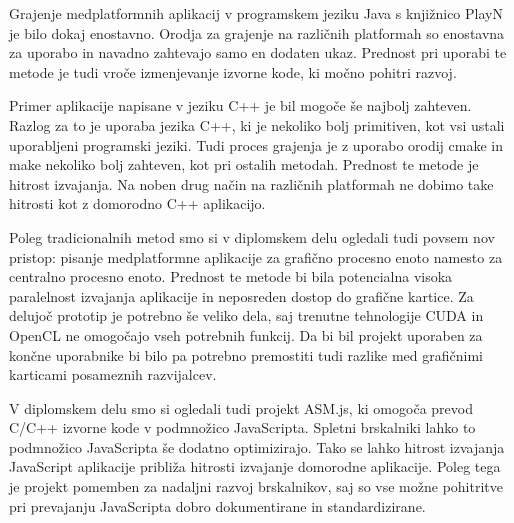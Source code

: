 Grajenje medplatformnih aplikacij v programskem jeziku Java s knjižnico PlayN je bilo dokaj enostavno. Orodja za grajenje na različnih platformah so enostavna za uporabo in navadno zahtevajo samo en dodaten ukaz. Prednost pri uporabi te metode je tudi vroče izmenjevanje izvorne kode, ki močno pohitri razvoj. 

Primer aplikacije napisane v jeziku C++ je bil mogoče še najbolj zahteven. Razlog za to je uporaba jezika C++, ki je nekoliko bolj primitiven, kot vsi ustali uporabljeni programski jeziki. Tudi proces grajenja je z uporabo orodij cmake in make nekoliko bolj zahteven, kot pri ostalih metodah. Prednost te metode je hitrost izvajanja. Na noben drug način na različnih platformah ne dobimo take hitrosti kot z domorodno C++ aplikacijo.

Poleg tradicionalnih metod smo si v diplomskem delu ogledali tudi povsem nov pristop: pisanje medplatformne aplikacije za grafično procesno enoto namesto za centralno procesno enoto. Prednost te metode bi bila potencialna visoka paralelnost izvajanja aplikacije in neposreden dostop do grafične kartice. Za delujoč prototip je potrebno še veliko dela, saj trenutne tehnologije CUDA in OpenCL ne omogočajo vseh potrebnih funkcij. Da bi bil projekt uporaben za končne uporabnike bi bilo pa potrebno premostiti tudi razlike med grafičnimi karticami posameznih razvijalcev. 

V diplomskem delu smo si ogledali tudi projekt ASM.js, ki omogoča prevod C/C++ izvorne kode v podmnožico JavaScripta. Spletni brskalniki lahko to podmnožico JavaScripta še dodatno optimizirajo. Tako se lahko hitrost izvajanja JavaScript aplikacije približa hitrosti izvajanje domorodne aplikacije. Poleg tega je projekt pomemben za nadaljni razvoj brskalnikov, saj so vse možne pohitritve pri prevajanju JavaScripta dobro dokumentirane in standardizirane.